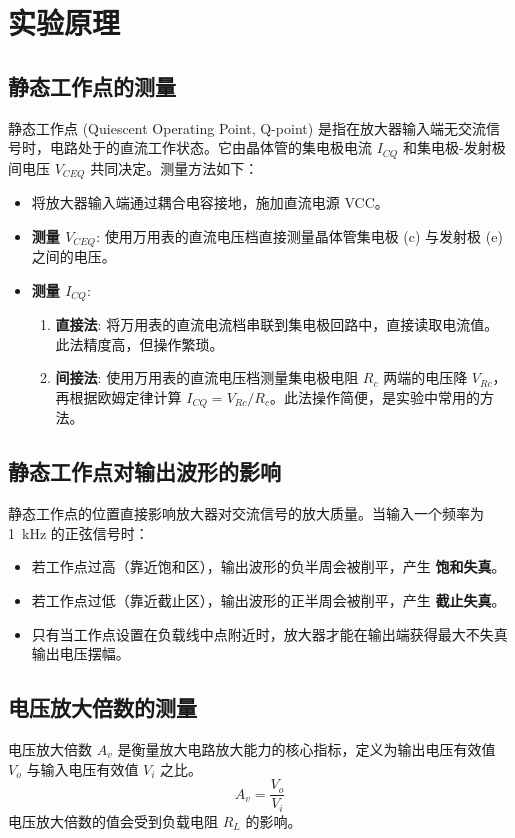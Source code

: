 \documentclass[UTF8]{ctexrep} %
\begin{document}
\section{实验原理}
\subsection{静态工作点的测量}
静态工作点 (Quiescent Operating Point, Q-point) 是指在放大器输入端无交流信号时，电路处于的直流工作状态。它由晶体管的集电极电流 $I_{CQ}$ 和集电极-发射极间电压 $V_{CEQ}$ 共同决定。测量方法如下：
\begin{itemize}
    \item 将放大器输入端通过耦合电容接地，施加直流电源 VCC。
    \item \textbf{测量 $V_{CEQ}$}: 使用万用表的直流电压档直接测量晶体管集电极 (c) 与发射极 (e) 之间的电压。
    \item \textbf{测量 $I_{CQ}$}:
    \begin{enumerate}
        \item \textbf{直接法}: 将万用表的直流电流档串联到集电极回路中，直接读取电流值。此法精度高，但操作繁琐。
        \item \textbf{间接法}: 使用万用表的直流电压档测量集电极电阻 $R_{c}$ 两端的电压降 $V_{Rc}$，再根据欧姆定律计算 $I_{CQ} = V_{Rc} / R_{c}$。此法操作简便，是实验中常用的方法。
    \end{enumerate}
\end{itemize}
\subsection{静态工作点对输出波形的影响}
静态工作点的位置直接影响放大器对交流信号的放大质量。当输入一个频率为 \SI{1}{\kilo\hertz} 的正弦信号时：
\begin{itemize}
    \item 若工作点过高（靠近饱和区），输出波形的负半周会被削平，产生 \textbf{饱和失真}。
    \item 若工作点过低（靠近截止区），输出波形的正半周会被削平，产生 \textbf{截止失真}。
    \item 只有当工作点设置在负载线中点附近时，放大器才能在输出端获得最大不失真输出电压摆幅。
\end{itemize}
\subsection{电压放大倍数的测量}
电压放大倍数 $A_v$ 是衡量放大电路放大能力的核心指标，定义为输出电压有效值 $V_o$ 与输入电压有效值 $V_i$ 之比。
\begin{equation}
    A_v = \frac{V_o}{V_i}
    \label{eq:Av}
\end{equation}
电压放大倍数的值会受到负载电阻 $R_L$ 的影响。
\end{document}
